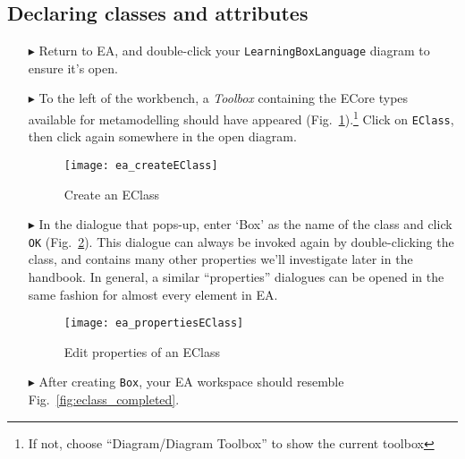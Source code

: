 \newpage
\subsection{Declaring classes and attributes}
\visHeader
\hypertarget{static:classes vis}{}

\begin{itemize}

\item[$\blacktriangleright$] Return to EA, and double-click your \texttt{LearningBoxLanguage} diagram to ensure it's open.

\vspace{0.5cm}

\item[$\blacktriangleright$] To the left of the workbench, a \emph{Toolbox} containing the ECore types available for metamodelling should have
appeared (Fig.~\ref{fig:eclass}).\footnote{If not, choose ``Diagram/Diagram Toolbox'' to show the current toolbox}  
Click on \texttt{EClass}, then click again somewhere in the open diagram.

\vspace{0.5cm}

\begin{figure}[htbp]
	\centering
  \texttt{[image: ea\_createEClass]}
	\caption{Create an EClass}
	\label{fig:eclass}
\end{figure}

\vspace{0.5cm}

\item[$\blacktriangleright$] In the dialogue that pops-up, enter `Box' as the name of the class and click \texttt{OK} (Fig.~\ref{fig:eclass_properties}).
This dialogue can always be invoked again by double-clicking the class, and contains many other properties we'll investigate later in the handbook.
In general, a similar ``properties'' dialogues can be opened in the same fashion for almost every element in EA.

\begin{figure}[ht]
	\centering
  \texttt{[image: ea\_propertiesEClass]}
	\caption{Edit properties of an EClass}
	\label{fig:eclass_properties}
\end{figure}

\newpage

\item[$\blacktriangleright$] After creating \texttt{Box}, your EA workspace should resemble Fig.~\ref{fig:eclass_completed}.


\end{itemize}
